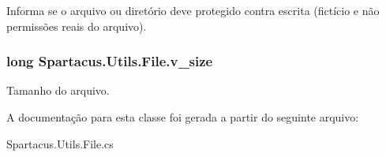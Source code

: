 Informa se o arquivo ou diretório deve protegido contra escrita (fictício e não permissões reais do arquivo). 

\hypertarget{classSpartacus_1_1Utils_1_1File_a174b72e731e64d86db44c6d781011137}{
\subsubsection[{v\+\_\+size}]{\setlength{\rightskip}{0pt plus 5cm}long Spartacus.\+Utils.\+File.\+v\+\_\+size}}\label{classSpartacus_1_1Utils_1_1File_a174b72e731e64d86db44c6d781011137}


Tamanho do arquivo. 



A documentação para esta classe foi gerada a partir do seguinte arquivo\+:\begin{DoxyCompactItemize}
\item 
Spartacus.\+Utils.\+File.\+cs\end{DoxyCompactItemize}
